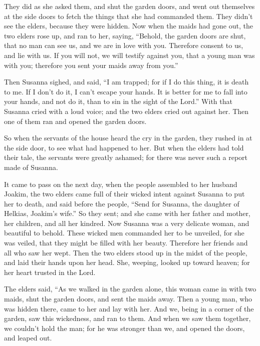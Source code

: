 {They did as she asked them, and shut the garden doors, and went out themselves at the side doors to fetch the things that she had commanded them. They didn’t see the elders, because they were hidden.
Now when the maids had gone out, the two elders rose up, and ran to her, saying,
“Behold, the garden doors are shut, that no man can see us, and we are in love with you. Therefore consent to us, and lie with us.
If you will not, we will testify against you, that a young man was with you; therefore you sent your maids away from you.”
\par }{\PP {}Then Susanna sighed, and said, “I am trapped; for if I do this thing, it is death to me. If I don’t do it, I can’t escape your hands.
It is better for me to fall into your hands, and not do it, than to sin in the sight of the Lord.”
With that Susanna cried with a loud voice; and the two elders cried out against her.
Then one of them ran and opened the garden doors.
\par }{\PP {}So when the servants of the house heard the cry in the garden, they rushed in at the side door, to see what had happened to her.
But when the elders had told their tale, the servants were greatly ashamed; for there was never such a report made of Susanna.
\par }{\PP {}It came to pass on the next day, when the people assembled to her husband Joakim, the two elders came full of their wicked intent against Susanna to put her to death,
and said before the people, “Send for Susanna, the daughter of Helkias, Joakim’s wife.” So they sent;
and she came with her father and mother, her children, and all her kindred.
Now Susanna was a very delicate woman, and beautiful to behold.
These wicked men commanded her to be unveiled, for she was veiled, that they might be filled with her beauty.
Therefore her friends and all who saw her wept.
Then the two elders stood up in the midst of the people, and laid their hands upon her head.
She, weeping, looked up toward heaven; for her heart trusted in the Lord.
\par }{\PP {}The elders said, “As we walked in the garden alone, this woman came in with two maids, shut the garden doors, and sent the maids away.
Then a young man, who was hidden there, came to her and lay with her.
And we, being in a corner of the garden, saw this wickedness, and ran to them.
And when we saw them together, we couldn’t hold the man; for he was stronger than we, and opened the doors, and leaped out.
}
